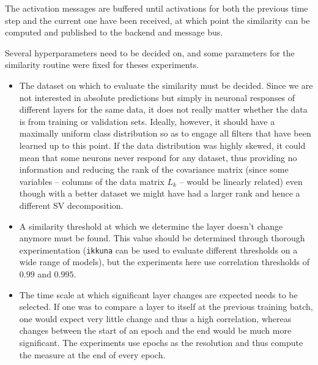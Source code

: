 The activation messages are buffered until activations for both the previous
time step and the current one have been received, at which point the similarity
can be computed and published to the backend and message bus.

Several hyperparameters need to be decided on, and some parameters for the
similarity routine were fixed for theses experiments.
\begin{itemize}
    \item The dataset on
        which to evaluate the similarity must be decided. Since we are not interested in
        absolute predictions but simply in neuronal responses of different layers for
        the same data, it does not really matter whether the data is from training or
        validation sets. Ideally, however, it should have a maximally uniform class
        distribution so as to engage all filters that have been learned up to this
        point. If the data distribution was highly skewed, it could mean that some
        neurons never respond for any dataset, thus providing no information and
        reducing the rank of the covariance matrix (since some variables -- columns of
        the data matrix $L_k$ -- would be linearly related) even though with a better
        dataset we might have had a larger rank and hence a different SV decomposition.
    \item A similarity threshold at which we determine the layer doesn't change
        anymore must be found. This value should be determined through thorough
        experimentation (\texttt{ikkuna} can be used to evaluate different
        thresholds on a wide range of models), but the experiments here use
        correlation thresholds of $0.99$ and $0.995$.
    \item The time scale at which significant layer changes are expected needs
        to be selected. If one was to compare a layer to itself at the previous
        training batch, one would expect very little change and thus a high
        correlation, whereas changes between the start of an epoch and the end
        would be much more significant. The experiments use epochs as the
        resolution and thus compute the measure at the end of every epoch.
\end{itemize}

